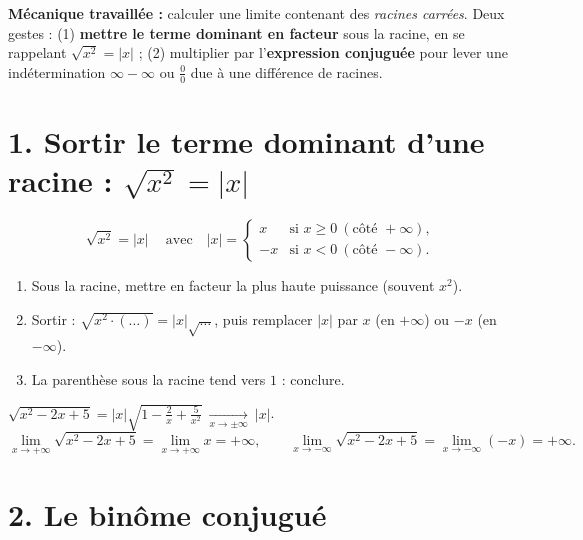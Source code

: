 \documentclass[11pt,a4paper]{article}
\begin{document}
\begin{tcolorbox}[boxbase,colback=primary!12,colframe=primary,
   title={\Large Thème 4 — Radicaux : facteur dominant \& binôme conjugué}]
\textbf{Mécanique travaillée :} calculer une limite contenant des \emph{racines carrées}. Deux gestes :
(1) \textbf{mettre le terme dominant en facteur} sous la racine, en se rappelant $\sqrt{x^2}=|x|$ ;
(2) multiplier par l'\textbf{expression conjuguée} pour lever une indétermination $\infty-\infty$ ou
$\frac00$ due à une différence de racines.
\end{tcolorbox}

\section{1. Sortir le terme dominant d'une racine : $\sqrt{x^2}=|x|$}

\begin{idee}
\[ \boxed{\ \sqrt{x^2}=|x|\ }\quad\text{avec}\quad |x|=\begin{cases} x & \text{si }x\geq 0\ (\text{côté }+\infty),\\ -x & \text{si }x<0\ (\text{côté }-\infty).\end{cases} \]
\end{idee}

\begin{methode}
\begin{enumerate}[leftmargin=1.9em,topsep=2pt,itemsep=1pt]
  \item Sous la racine, mettre en facteur la plus haute puissance (souvent $x^2$).
  \item Sortir : $\sqrt{x^2\cdot(\dots)}=|x|\sqrt{\dots}$, puis remplacer $|x|$ par $x$ (en $+\infty$) ou $-x$ (en $-\infty$).
  \item La parenthèse sous la racine tend vers $1$ : conclure.
\end{enumerate}
\end{methode}

\begin{exemple}[le rôle de $|x|$]
$\sqrt{x^2-2x+5}=|x|\sqrt{1-\tfrac2x+\tfrac{5}{x^2}}\ \xrightarrow[x\to\pm\infty]{}\ |x|$.
\[ \lim_{x\to+\infty}\sqrt{x^2-2x+5}=\lim_{x\to+\infty} x=+\infty,\qquad
   \lim_{x\to-\infty}\sqrt{x^2-2x+5}=\lim_{x\to-\infty}(-x)=+\infty. \]
\end{exemple}

\section{2. Le binôme conjugué}
\end{document}
